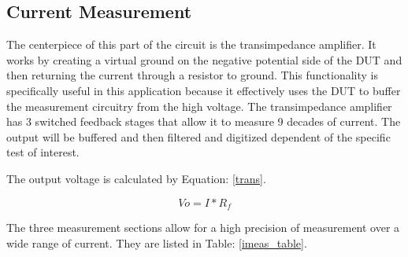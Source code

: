 \subsection{Current Measurement}

The centerpiece of this part of the circuit is the transimpedance amplifier. It works by creating a virtual ground on the negative potential side of the DUT and then returning the current through a resistor to ground. This functionality is specifically useful in this application because it effectively uses the DUT to buffer the measurement circuitry from the high voltage. The transimpedance amplifier has 3 switched feedback stages that allow it to measure 9 decades of current. The output will be buffered and then filtered and digitized dependent of the specific test of interest.

The output voltage is calculated by Equation: \eqref{trans}.

\begin{equation}
\label{trans}
Vo = I*R_f
\end{equation}

The three measurement sections allow for a high precision of measurement over a wide range of current. They are listed in Table: \ref{imeas_table}.



